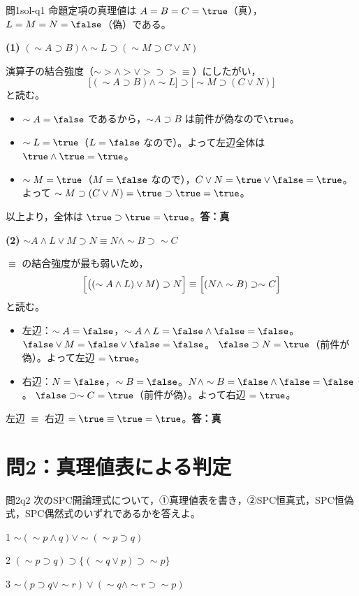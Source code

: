 \documentclass[autodetect-engine,dvi=dvipdfmx,ja=standard]{bxjsarticle}
\begin{document}
\begin{solution}{問1}{sol-q1}
命題定項の真理値は \(A=B=C=\true\)（真），\(L=M=N=\false\)（偽）である。

\textbf{(1)} \((\sim A\supset B)\land\sim L\supset(\sim M\supset C\lor N)\)

演算子の結合強度（\(\sim>\land>\lor>\supset>\equiv\)）にしたがい，
\[
  \bigl[(\sim A\supset B)\land\sim L\bigr]\supset\bigl[\sim M\supset(C\lor N)\bigr]
\]
と読む。
\begin{itemize}
  \item \(\sim A=\false\) であるから，\(\sim A\supset B\) は前件が偽なので\(\true\)。
  \item \(\sim L=\true\)（\(L=\false\) なので）。よって左辺全体は \(\true\land\true=\true\)。
  \item \(\sim M=\true\)（\(M=\false\) なので），\(C\lor N=\true\lor\false=\true\)。よって \(\sim M\supset(C\lor N)=\true\supset\true=\true\)。
\end{itemize}
以上より，全体は \(\true\supset\true=\true\)。\textbf{答：真}

\textbf{(2)} \(\sim A\land L\lor M\supset N\equiv N\land\sim B\supset\sim C\)

\(\equiv\) の結合強度が最も弱いため，
\[
  \Bigl[\bigl((\sim A\land L)\lor M\bigr)\supset N\Bigr]
  \equiv
  \Bigl[(N\land\sim B)\supset\sim C\Bigr]
\]
と読む。
\begin{itemize}
  \item 左辺：\(\sim A=\false\)，\(\sim A\land L=\false\land\false=\false\)。\(\false\lor M=\false\lor\false=\false\)。
    \(\false\supset N=\true\)（前件が偽）。よって左辺 \(=\true\)。
  \item 右辺：\(N=\false\)，\(\sim B=\false\)。\(N\land\sim B=\false\land\false=\false\)。
    \(\false\supset\sim C=\true\)（前件が偽）。よって右辺 \(=\true\)。
\end{itemize}
左辺 \(\equiv\) 右辺 \(=\true\equiv\true=\true\)。\textbf{答：真}
\end{solution}

\section{問2：真理値表による判定}

\begin{exercise}{問2}{q2}
次のSPC開論理式について，①真理値表を書き，②SPC恒真式，SPC恒偽式，SPC偶然式のいずれであるかを答えよ。
\begin{pstep}{1}
  \(\sim(\sim p\land q)\lor\sim(\sim p\supset q)\)
\end{pstep}
\begin{pstep}{2}
  \((\sim p\supset q)\supset\bigl\{(\sim q\lor p)\supset\sim p\bigr\}\)
\end{pstep}
\begin{pstep}{3}
  \(\sim(p\supset q\lor\sim r)\lor(\sim q\land\sim r\supset\sim p)\)
\end{pstep}
\end{exercise}
\end{document}
